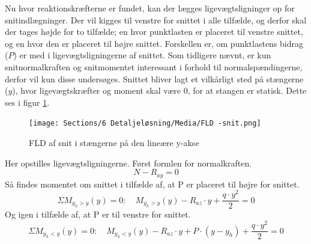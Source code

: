 Nu hvor reaktionskræfterne er fundet, kan der lægges ligevægtsligninger op for snitindlægninger. Der vil kigges til venstre for snittet i alle tilfælde, og derfor skal der tages højde for to tilfælde; en hvor punktlasten er placeret til venstre snittet, og en hvor den er placeret til højre snittet. Forskellen er, om punktlastens bidrag ($P$) er med i ligevægtsligningerne af snittet. Som tidligere nævnt, er kun snitnormalkraften og snitmomentet interessant i forhold til normalspændingerne, derfor vil kun disse undersøges.
Snittet bliver lagt et vilkårligt sted på stængerne ($y$), hvor ligevægtskræfter og moment skal være 0, for at stangen er statisk. Dette ses i figur \ref{fig: Snit i y-akse}.
\begin{figure}[H]
    \centering
    \texttt{[image: Sections/6 Detaljeløsning/Media/FLD -snit.png]}
    \caption{FLD af snit i stængerne på den lineære y-akse}
    \label{fig: Snit i y-akse}
\end{figure}

Her opstilles ligevægtsligningerne. Først formlen for normalkraften.
\begin{equation}\label{formel: snitnormal}
    N-R_{ay}=0
\end{equation}
Så findes momentet om snittet i tilfælde af, at P er placeret til højre for snittet.
\begin{equation} \label{formel: M_y_h>y(y)}
  \Sigma M_{y_h>y}(y)=0:\quad  M_{y_h>y}(y)- R_{az}\cdot y+\frac{q\cdot y^2}{2}=0
\end{equation}
Og igen i tilfælde af, at P er til venstre for snittet.
\begin{equation} \label{formel: M_y_h<y(y)}
   \Sigma M_{y_h<y}(y)=0:\quad  M_{y_h<y}(y)-R_{az}\cdot y+P\cdot(y-y_h)+\frac{q\cdot y^2}{2}=0
\end{equation}

